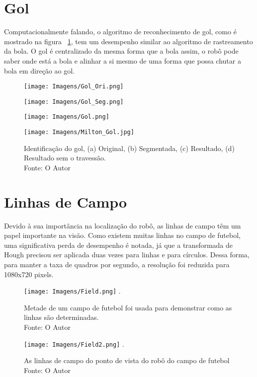 \section{Gol}
Computacionalmente falando, o algoritmo de reconhecimento de gol, como é mostrado na figura ~\ref{fig:Goal}, tem um desempenho similar ao algoritmo de rastreamento da bola. O gol é centralizado da mesma forma que a bola assim, o robô pode saber onde está a bola e alinhar a si mesmo de uma forma que possa chutar a bola em direção ao gol.


\begin{figure}[!ht]
\centering
\parbox{2.5in}{\texttt{[image: Imagens/Gol\_Ori.png]}} 
\qquad 
\begin{minipage}{2.5in}%
\texttt{[image: Imagens/Gol\_Seg.png]}
\end{minipage}
\vspace*{3mm}

\parbox{2.5in}{\texttt{[image: Imagens/Gol.png]}} 
\qquad
\begin{minipage}{2.5in}%
\texttt{[image: Imagens/Milton\_Gol.jpg]}
\end{minipage}%

\caption{Identificação do gol, (a) Original, (b) Segmentada, (c) Resultado, (d) Resultado sem o travessão.\\ Fonte: O Autor }%
\label{fig:Goal}%
\end{figure}


\section{Linhas de Campo}

Devido à sua importância na localização do robô, as linhas de campo têm um papel importante na visão. Como existem muitas linhas no campo de futebol, uma significativa perda de desempenho é notada, já que a transformada de Hough precisou ser aplicada duas vezes para linhas e para círculos. Dessa forma, para manter a taxa de quadros por segundo, a resolução foi reduzida para 1080x720 pixels. 

\begin{figure}[!h1]
\centering
\texttt{[image: Imagens/Field.png]}
\DeclareGraphicsExtensions.
\caption{Metade de um campo de futebol foi usada para demonstrar como as linhas são determinadas. \\ Fonte: O Autor}
\label{Fig:F1}
\end{figure}

\begin{figure}[!h1]
\centering
\texttt{[image: Imagens/Field2.png]}
\DeclareGraphicsExtensions.
\caption{As linhas de campo do ponto de vista do robô do campo de futebol\\ Fonte: O Autor}
\label{Fig:F2}
\end{figure}
